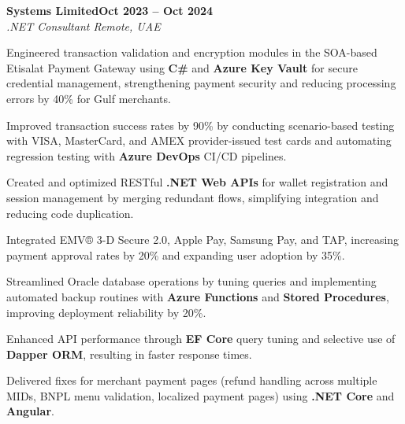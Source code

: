 \documentclass[letterpaper,10pt]{article}
\newcommand{\headingBf}[2]{
  \hspace{10pt}\textbf{#1}\hfill\textbf{#2}\\
}
\newcommand{\headingIt}[2]{
  \hspace{10pt}\textit{#1}\hfill\textit{#2}\\
}
\newenvironment{resume_list}{
  \vspace{-7pt}
  \begin{itemize}[itemsep=-2px, parsep=1pt, leftmargin=30pt]
}{
  \end{itemize}
}
\begin{document}
\headingBf{Systems Limited}{Oct 2023 -- Oct 2024}
\headingIt{.NET Consultant \hfill Remote, UAE}{}
\begin{resume_list}
    \item Engineered transaction validation and encryption modules in the SOA-based Etisalat Payment Gateway using \textbf{C\#} and \textbf{Azure Key Vault} for secure credential management, strengthening payment security and reducing processing errors by 40\% for Gulf merchants.
    \item Improved transaction success rates by 90\% by conducting scenario-based testing with VISA, MasterCard, and AMEX provider-issued test cards and automating regression testing with \textbf{Azure DevOps} CI/CD pipelines.
    \item Created and optimized RESTful \textbf{.NET Web APIs} for wallet registration and session management by merging redundant flows, simplifying integration and reducing code duplication.
    \item Integrated EMV® 3-D Secure 2.0, Apple Pay, Samsung Pay, and TAP, increasing payment approval rates by 20\% and expanding user adoption by 35\%.
    \item Streamlined Oracle database operations by tuning queries and implementing automated backup routines with \textbf{Azure Functions} and \textbf{Stored Procedures}, improving deployment reliability by 20\%.
    \item Enhanced API performance through \textbf{EF Core} query tuning and selective use of \textbf{Dapper ORM}, resulting in faster response times.
    \item Delivered fixes for merchant payment pages (refund handling across multiple MIDs, BNPL menu validation, localized payment pages) using \textbf{.NET Core} and \textbf{Angular}.
\end{resume_list}
\end{document}
